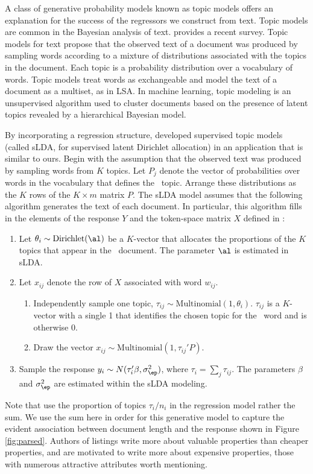 \documentclass[12pt]{article}
\begin{document}
A class of generative probability models known as topic models offers an explanation for the success of the regressors we construct from text.  Topic models are common in the Bayesian analysis of text. \citet{blei12} provides a recent survey.   Topic models for text propose that the observed text of a document was produced by sampling words according to a mixture of distributions associated with the topics in the document.  Each topic is a probability distribution over a vocabulary of words.  Topic models treat words as exchangeable and model the text of a document as a multiset,  as in LSA.  In machine learning, topic modeling is  an unsupervised algorithm used to cluster documents based on the presence of latent topics revealed by a hierarchical Bayesian model. 


By incorporating a regression structure,  \citet{bleimcauliffe07} developed supervised topic models (called sLDA, for supervised latent Dirichlet allocation) in an application that is similar to ours.  Begin with the assumption that the observed text was produced by sampling words from $K$ topics. Let $P_j$ denote the vector of probabilities over words in the vocabulary that defines the \ith[j]\ topic.  Arrange these distributions as the $K$ rows of the $K \times m$ matrix $P$.  The sLDA model assumes that  the following algorithm generates the text of each document.  In particular, this algorithm fills in the elements of the response $Y$ and the token-space matrix $X$ defined in :
\begin{enumerate}
 \item Let $\theta_i \sim \mbox{Dirichlet}(\al)$ be a $K$-vector that allocates the proportions of
          the $K$ topics that appear in the \ith\ document.  The parameter $\al$ is estimated in sLDA.
 \item Let $x_{ij}$ denote the row of $X$ associated with word $w_{ij}$.
    \begin{enumerate} 
      \item Independently sample one topic, $\tau_{ij} \sim \mbox{Multinomial}(1, \theta_i)$. 
               $\tau_{ij}$ is a $K$-vector with a single 1 that identifies the chosen topic for the \ith[j]\ word and
               is otherwise 0.
       \item Draw the vector $x_{ij} \sim \mbox{Multinomial}(1, \tau_{ij}'P)$.
    \end{enumerate}
  \item Sample the response $y_i \sim N(\tau_i'\beta, \sigma_\ep^2)$, where $\tau_i = \sum_j \tau_{ij}$.  The
           parameters $\beta$ and $\sigma_\ep^2$ are estimated within the sLDA modeling.
\end{enumerate}
Note that \citet{bleimcauliffe07} use the proportion of topics $\tau_i/n_i$ in the regression model rather the sum.  We use the sum here in order for this generative model to capture the evident association between document length and the response shown in Figure \ref{fig:parsed}.  Authors of listings write more about valuable properties than cheaper properties, and are motivated to write more about expensive properties, those with numerous attractive attributes worth mentioning.  
\end{document}
